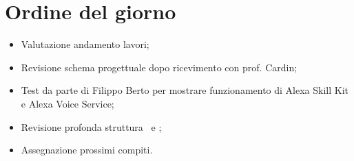 \documentclass[../verbale-2017-02-21.tex]{subfiles}
\begin{document}
	
\section{Ordine del giorno}
	\begin{itemize}
		\item Valutazione andamento lavori;
		\item Revisione schema progettuale dopo ricevimento con prof. Cardin;
		\item Test da parte di Filippo Berto per mostrare funzionamento di Alexa Skill Kit e Alexa Voice Service;
		\item Revisione profonda struttura \pianodiqualificaRR\ e \normediprogettoRR;
		\item Assegnazione prossimi compiti.
	\end{itemize}
	
\end{document}
